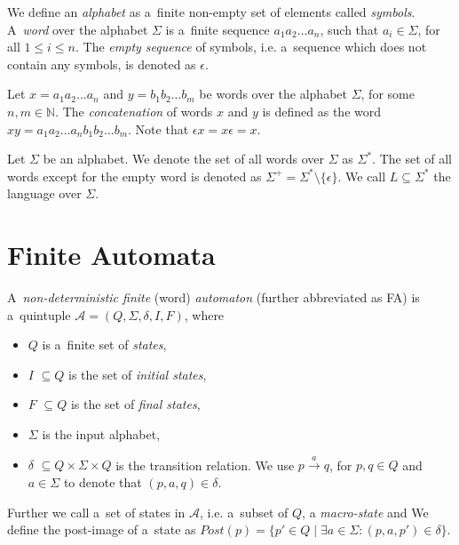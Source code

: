  We define an \emph{alphabet} as a~finite non-empty set of elements called
 \emph{symbols}. A~\emph{word} over the alphabet $\Sigma$ is a~finite sequence
 $a_1a_2\ldots a_n$, such that $a_i \in \Sigma$, for all $1 \leq i \leq n$. The
 \emph{empty sequence} of symbols, i.e. a~sequence  which does not contain any
 symbols, is denoted as $\epsilon$.

Let $x = a_1a_2\ldots a_n$ and $y = b_1b_2\ldots b_m$ be words over the alphabet
$\Sigma$, for some $n, m \in \mathbb{N}$. The \emph{concatenation} of words $x$
and $y$ is defined as the word $xy = a_1a_2\ldots a_nb_1b_2\ldots b_m$. Note
that $\epsilon x = x \epsilon = x$.

Let $\Sigma$ be an alphabet. We denote the set of all words over $\Sigma$ as
$\Sigma^*$. The set of all words except for the empty word is denoted as
$\Sigma^+ = \Sigma^* \setminus \{\epsilon\}$. We call $L \subseteq \Sigma^*$ the
language over $\Sigma$.

 \section{Finite Automata}

 A~\emph{non-deterministic finite} (word) \emph{automaton} (further abbreviated
 as FA) is a~quintuple $\mathcal{A} = (Q, \Sigma, \delta, I, F)$, where
  \begin{itemize}
\item $Q$ is a~finite set of \emph{states}, \item $I$ $ \subseteq Q$ is the set
of \emph{initial states}, \item $F$ $ \subseteq Q$ is the set of \emph{final
states}, \item $\Sigma$ is the input alphabet, \item $\delta$ $ \subseteq Q
\times\Sigma\times Q$ is the transition relation. We use $p
\overset{a}{\longrightarrow} q$, for $p, q \in Q$ and $a \in \Sigma$ to denote
that $(p, a, q) \in \delta$.
	\end{itemize}
	
	Further we call a~set of states in $\mathcal{A}$, i.e. a~subset of $Q$, a
\emph{macro-state} and We define the post-image of a~state as
$Post(p) = \{p'\in Q \mid \exists a \in \Sigma: (p, a, p') \in \delta\}$.
	
